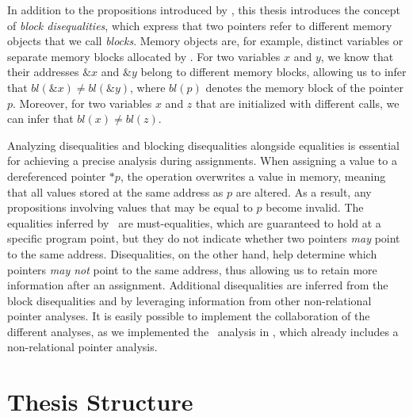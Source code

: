 In addition to the propositions introduced by \textcite{2pointer}, this thesis introduces the concept of \emph{block disequalities},
which express that two pointers refer to different memory objects that we call \emph{blocks}.
Memory objects are, for example, distinct variables or separate memory blocks allocated by \malloc.
For two variables $x$ and $y$, we know that their addresses $\&x$ and $\&y$ belong to different memory blocks,
allowing us to infer that $bl(\&x) \neq bl(\&y)$, where $bl(p)$ denotes the memory block of the pointer $p$.
Moreover, for two variables $x$ and $z$ that are initialized with different \malloc calls,
we can infer that $bl(x) \neq bl(z)$.

Analyzing disequalities and blocking disequalities alongside equalities is essential for achieving a precise analysis during assignments.
When assigning a value to a dereferenced pointer $*p$,
the operation overwrites a value in memory, meaning that all values stored at the same address as
$p$ are altered.
As a result, any propositions involving values that may be equal to $p$ become invalid.
The equalities inferred by \cpo\ are must-equalities, which are guaranteed to hold at a specific program point, but they do not indicate whether two pointers \emph{may} point to the same address.
Disequalities, on the other hand, help determine which pointers \emph{may not} point to the same address,
thus allowing us to retain more information after an assignment.
Additional disequalities are inferred from the block disequalities and by
leveraging information from other non-relational pointer analyses.
It is easily possible to implement the collaboration of the different analyses, as we implemented the \cpo\ analysis in \goblint, which already includes a non-relational pointer analysis.

\section{Thesis Structure}

